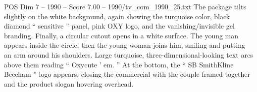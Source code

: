 \begin{textsample}{POS Dim 7 – 1990 – Score 7.00 – 1990/tv\_com\_1990\_25.txt}
The package tilts slightly on the white background, again showing the turquoise color, black diamond “ sensitive ” panel, pink OXY logo, and the vanishing/invisible gel branding.
Finally, a circular cutout opens in a white surface.
The young man appears inside the circle, then the young woman joins him, smiling and putting an arm around his shoulders.
Large turquoise, three-dimensional-looking text arcs above them reading “ Oxycute ’ em. ” At the bottom, the “ SB SmithKline Beecham ” logo appears, closing the commercial with the couple framed together and the product slogan hovering overhead.

\end{textsample}
